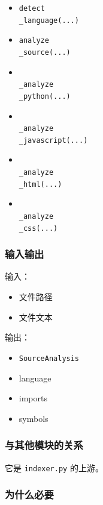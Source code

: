 \documentclass[UTF8,12pt,openany]{ctexbook}
\begin{document}
\begin{itemize}
\item \texttt{detect\\_language(...)}
\item \texttt{analyze\\_source(...)}
\item \texttt{\\_analyze\\_python(...)}
\item \texttt{\\_analyze\\_javascript(...)}
\item \texttt{\\_analyze\\_html(...)}
\item \texttt{\\_analyze\\_css(...)}
\end{itemize}

\subsubsection{输入输出}

输入：\par

\begin{itemize}
\item 文件路径
\item 文件文本
\end{itemize}

输出：\par

\begin{itemize}
\item \texttt{SourceAnalysis}
\item language
\item imports
\item symbols
\end{itemize}

\subsubsection{与其他模块的关系}

它是 \texttt{indexer.py} 的上游。\par

\subsubsection{为什么必要}
\end{document}
